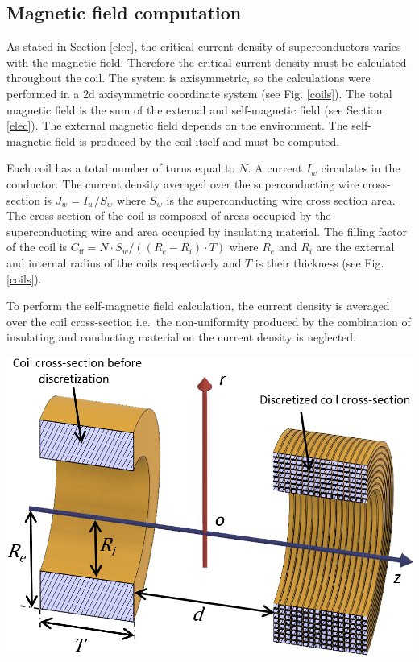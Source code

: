 \documentclass{ws-jmrr}
\begin{document}
\begin{multicols}{2}
\subsection{Magnetic field computation}
As stated in Section \ref{elec}, the critical current density of superconductors varies with the magnetic field.
  Therefore the critical current density must be calculated throughout the coil. 
   The system is axisymmetric, so the calculations were performed in a 2d axisymmetric coordinate system (see Fig. \ref{coils}). 
   The total magnetic field is the sum of the external and self-magnetic field (see Section \ref{elec}). 
    The external magnetic field depends on the environment. The self-magnetic field is produced by the coil itself and must be computed.\par
Each coil has a total number of turns equal to $N$. A current $I_w$ circulates in the conductor. The current density averaged over the superconducting wire cross-section is $J_w=I_w/S_w$ where $S_w$ is the superconducting wire cross section area. 
The cross-section of the coil is composed of areas occupied by the superconducting wire and area occupied by insulating material. 
The filling factor of the coil is $C_{\textrm{ff}}=N\cdot S_w/((R_e-R_i)\cdot T)$ where $R_e$ and $R_i$ are the external and internal radius of the coils respectively and $T$ is their thickness (see Fig. \ref{coils}).\par
To perform the self-magnetic field calculation, the current density is averaged over the coil cross-section i.e.\ the non-uniformity produced by the combination of insulating and conducting material on the current density is neglected.  
\begin{figurehere}
	\begin{center}
	\includegraphics[width=\linewidth]{coil_system.png}

\end{center}
\end{figurehere}
\end{multicols}
\end{document}
